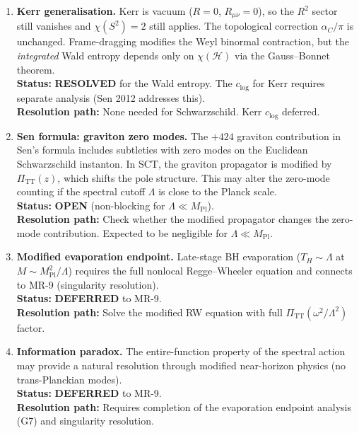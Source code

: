 \documentclass[12pt,a4paper]{article}
\theoremstyle{definition}
\theoremstyle{remark}
\begin{document}
\begin{enumerate}[label=\textbf{G\arabic*:},leftmargin=3em]
\item \textbf{Kerr generalisation.}
  Kerr is vacuum ($R = 0$, $R_{\mu\nu} = 0$), so the $R^2$
  sector still vanishes and $\chi(S^2) = 2$ still applies.
  The topological correction $\alpha_C/\pi$ is unchanged.
  Frame-dragging modifies the Weyl binormal contraction, but
  the \emph{integrated} Wald entropy depends only on
  $\chi(\mathcal{H})$ via the Gauss--Bonnet theorem.\\
  \textbf{Status:} \textcolor{green!50!black}{\textbf{RESOLVED}}
  for the Wald entropy.  The $c_{\log}$ for Kerr requires
  separate analysis (Sen 2012 addresses this).\\
  \textbf{Resolution path:} None needed for Schwarzschild.
  Kerr $c_{\log}$ deferred.

\item \textbf{Sen formula: graviton zero modes.}
  The $+424$ graviton contribution in Sen's formula includes
  subtleties with zero modes on the Euclidean Schwarzschild
  instanton.  In SCT, the graviton propagator is modified by
  $\Pi_{\mathrm{TT}}(z)$, which shifts the pole structure.
  This may alter the zero-mode counting if the spectral
  cutoff $\Lambda$ is close to the Planck scale.\\
  \textbf{Status:} \textcolor{orange!80!black}{\textbf{OPEN}}
  (non-blocking for $\Lambda \ll M_{\mathrm{Pl}}$).\\
  \textbf{Resolution path:} Check whether the modified
  propagator changes the zero-mode contribution.  Expected
  to be negligible for $\Lambda \ll M_{\mathrm{Pl}}$.

\item \textbf{Modified evaporation endpoint.}
  Late-stage BH evaporation ($T_H \sim \Lambda$ at
  $M \sim M_{\mathrm{Pl}}^2/\Lambda$) requires the full nonlocal
  Regge--Wheeler equation and connects to MR-9 (singularity
  resolution).\\
  \textbf{Status:} \textcolor{blue!60!black}{\textbf{DEFERRED}}
  to MR-9.\\
  \textbf{Resolution path:} Solve the modified RW equation
  with full $\Pi_{\mathrm{TT}}(\omega^2/\Lambda^2)$ factor.

\item \textbf{Information paradox.}
  The entire-function property of the spectral action may provide
  a natural resolution through modified near-horizon physics
  (no trans-Planckian modes).\\
  \textbf{Status:} \textcolor{blue!60!black}{\textbf{DEFERRED}}
  to MR-9.\\
  \textbf{Resolution path:} Requires completion of the
  evaporation endpoint analysis (G7) and singularity resolution.

\end{enumerate}
\end{document}

